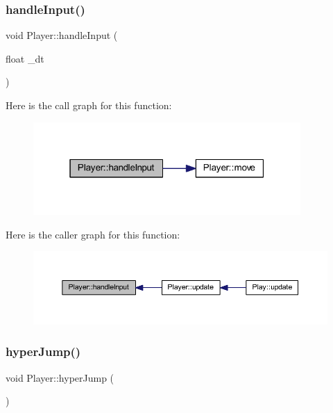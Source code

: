 \subsubsection{\texorpdfstring{handle\+Input()}{handleInput()}}
{\footnotesize\ttfamily void Player\+::handle\+Input (\begin{DoxyParamCaption}\item[{float}]{\+\_\+dt }\end{DoxyParamCaption})}

Here is the call graph for this function\+:
\nopagebreak
\begin{figure}[H]
\begin{center}
\leavevmode
\includegraphics[width=289pt]{class_player_a4d9c040f4b766e3052369bae0fd116d7_cgraph}
\end{center}
\end{figure}
Here is the caller graph for this function\+:
\nopagebreak
\begin{figure}[H]
\begin{center}
\leavevmode
\includegraphics[width=350pt]{class_player_a4d9c040f4b766e3052369bae0fd116d7_icgraph}
\end{center}
\end{figure}
\mbox{\label{class_player_a012354ce1dfa33d6393c41afc4db0e6c}} 
\subsubsection{\texorpdfstring{hyper\+Jump()}{hyperJump()}}
{\footnotesize\ttfamily void Player\+::hyper\+Jump (\begin{DoxyParamCaption}{ }\end{DoxyParamCaption})}

